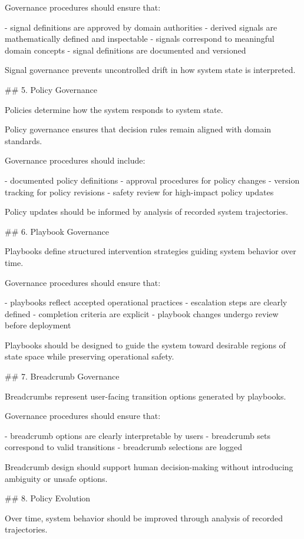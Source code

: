 Governance procedures should ensure that:

- signal definitions are approved by domain authorities
- derived signals are mathematically defined and inspectable
- signals correspond to meaningful domain concepts
- signal definitions are documented and versioned

Signal governance prevents uncontrolled drift in how system state is interpreted.

## 5. Policy Governance

Policies determine how the system responds to system state.

Policy governance ensures that decision rules remain aligned with domain standards.

Governance procedures should include:

- documented policy definitions
- approval procedures for policy changes
- version tracking for policy revisions
- safety review for high-impact policy updates

Policy updates should be informed by analysis of recorded system trajectories.

## 6. Playbook Governance

Playbooks define structured intervention strategies guiding system behavior over time.

Governance procedures should ensure that:

- playbooks reflect accepted operational practices
- escalation steps are clearly defined
- completion criteria are explicit
- playbook changes undergo review before deployment

Playbooks should be designed to guide the system toward desirable regions of state space while preserving operational safety.

## 7. Breadcrumb Governance

Breadcrumbs represent user-facing transition options generated by playbooks.

Governance procedures should ensure that:

- breadcrumb options are clearly interpretable by users
- breadcrumb sets correspond to valid transitions
- breadcrumb selections are logged

Breadcrumb design should support human decision-making without introducing ambiguity or unsafe options.

## 8. Policy Evolution

Over time, system behavior should be improved through analysis of recorded trajectories.

